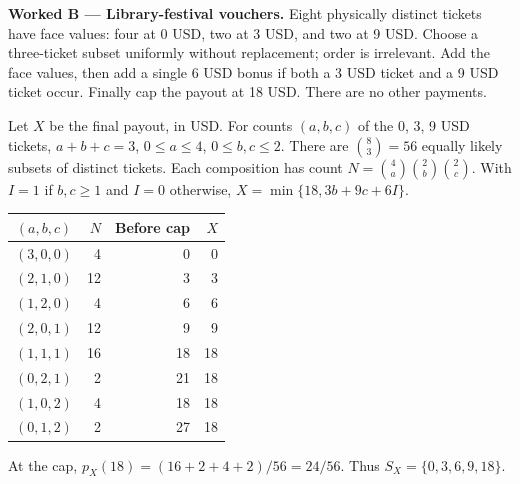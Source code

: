 \medskip
\noindent\textbf{Worked B --- Library-festival vouchers.}
Eight physically distinct tickets have face values: four at 0 USD, two at 3 USD,
and two at 9 USD. Choose a three-ticket subset uniformly without replacement;
order is irrelevant. Add the face values, then add a single 6 USD bonus if
both a 3 USD ticket and a 9 USD ticket occur. Finally cap the payout at 18 USD.
There are no other payments.
\par
Let $X$ be the final payout, in USD.
For counts $(a,b,c)$ of the 0, 3, 9 USD tickets,
$a+b+c=3$, $0\leq a\leq4$, $0\leq b,c\leq2$.
There are $\binom83=56$ equally likely subsets of distinct tickets.
Each composition has count
$N=\binom4a\binom2b\binom2c$.
With $I=1$ if $b,c\geq1$ and $I=0$ otherwise,
$X=\min\{18,3b+9c+6I\}$.
\par\noindent
\begin{minipage}[t]{.40\linewidth}
\vspace{0pt}\centering
\begin{tabular}{@{}crrr@{}}\toprule
$(a,b,c)$ & $N$ & Before cap & $X$\\\midrule
$(3,0,0)$ & 4 & 0 & 0\\
$(2,1,0)$ & 12 & 3 & 3\\
$(1,2,0)$ & 4 & 6 & 6\\
$(2,0,1)$ & 12 & 9 & 9\\
$(1,1,1)$ & 16 & 18 & 18\\
$(0,2,1)$ & 2 & 21 & 18\\
$(1,0,2)$ & 4 & 18 & 18\\
$(0,1,2)$ & 2 & 27 & 18\\\bottomrule
\end{tabular}
\par\raggedright At the cap, $p_X(18)=(16+2+4+2)/56=24/56$.
Thus $S_X=\{0,3,6,9,18\}$.
\end{minipage}\hfill
\begin{minipage}[t]{.57\linewidth}
\vspace{0pt}\centering
{}
\end{minipage}\par
